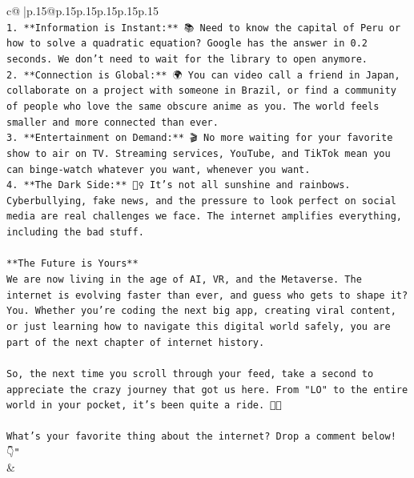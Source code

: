 \documentclass{article}
\begin{document}
{\begin{supertabular}{c@{$\;$}|p{.15\linewidth}@{}p{.15\linewidth}p{.15\linewidth}p{.15\linewidth}p{.15\linewidth}p{.15\linewidth}}
{{{\\ 
\texttt{1.  **Information is Instant:** 📚 Need to know the capital of Peru or how to solve a quadratic equation? Google has the answer in 0.2 seconds. We don't need to wait for the library to open anymore.} \\
\texttt{2.  **Connection is Global:** 🌍 You can video call a friend in Japan, collaborate on a project with someone in Brazil, or find a community of people who love the same obscure anime as you. The world feels smaller and more connected than ever.} \\
\texttt{3.  **Entertainment on Demand:** 🎬 No more waiting for your favorite show to air on TV. Streaming services, YouTube, and TikTok mean you can binge{-}watch whatever you want, whenever you want.} \\
\texttt{4.  **The Dark Side:** 🕵️‍♀️ It's not all sunshine and rainbows. Cyberbullying, fake news, and the pressure to look perfect on social media are real challenges we face. The internet amplifies everything, including the bad stuff.} \\
\\ 
\texttt{**The Future is Yours**} \\
\texttt{We are now living in the age of AI, VR, and the Metaverse. The internet is evolving faster than ever, and guess who gets to shape it? You. Whether you're coding the next big app, creating viral content, or just learning how to navigate this digital world safely, you are part of the next chapter of internet history.} \\
\\ 
\texttt{So, the next time you scroll through your feed, take a second to appreciate the crazy journey that got us here. From "LO" to the entire world in your pocket, it's been quite a ride. 🚀✨} \\
\\ 
\texttt{What's your favorite thing about the internet? Drop a comment below! 👇"} \\
            }
        }
    }
    & \\ \\


\end{supertabular}}
\end{document}
